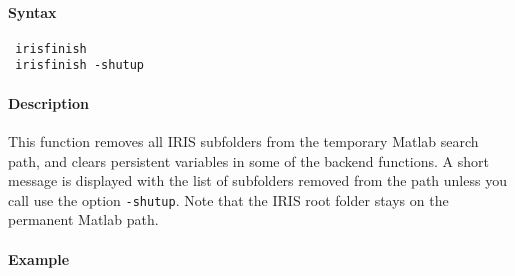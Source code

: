 


	\paragraph{Syntax}
 
 \begin{verbatim}
 irisfinish
 irisfinish -shutup
 \end{verbatim}
 
 \paragraph{Description}
 
 This function removes all IRIS subfolders from the temporary Matlab
 search path, and clears persistent variables in some of the backend
 functions. A short message is displayed with the list of subfolders
 removed from the path unless you call use the option \texttt{-shutup}.
 Note that the IRIS root folder stays on the permanent Matlab path.
 
 \paragraph{Example}


